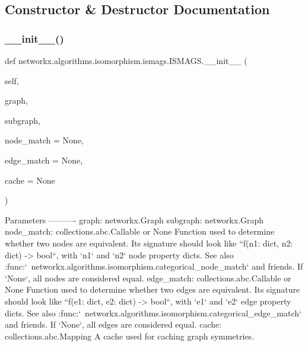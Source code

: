 \subsection{Constructor \& Destructor Documentation}
\mbox{\label{classnetworkx_1_1algorithms_1_1isomorphism_1_1ismags_1_1ISMAGS_a15c73c9b3bbbac8a6a2bf8c6d53e9528}} 
\subsubsection{\texorpdfstring{\+\_\+\+\_\+init\+\_\+\+\_\+()}{\_\_init\_\_()}}
{\footnotesize\ttfamily def networkx.\+algorithms.\+isomorphism.\+ismags.\+I\+S\+M\+A\+G\+S.\+\_\+\+\_\+init\+\_\+\+\_\+ (\begin{DoxyParamCaption}\item[{}]{self,  }\item[{}]{graph,  }\item[{}]{subgraph,  }\item[{}]{node\+\_\+match = {\ttfamily None},  }\item[{}]{edge\+\_\+match = {\ttfamily None},  }\item[{}]{cache = {\ttfamily None} }\end{DoxyParamCaption})}

\begin{DoxyVerb}Parameters
----------
graph: networkx.Graph
subgraph: networkx.Graph
node_match: collections.abc.Callable or None
    Function used to determine whether two nodes are equivalent. Its
    signature should look like ``f(n1: dict, n2: dict) -> bool``, with
    `n1` and `n2` node property dicts. See also
    :func:`~networkx.algorithms.isomorphism.categorical_node_match` and
    friends.
    If `None`, all nodes are considered equal.
edge_match: collections.abc.Callable or None
    Function used to determine whether two edges are equivalent. Its
    signature should look like ``f(e1: dict, e2: dict) -> bool``, with
    `e1` and `e2` edge property dicts. See also
    :func:`~networkx.algorithms.isomorphism.categorical_edge_match` and
    friends.
    If `None`, all edges are considered equal.
cache: collections.abc.Mapping
    A cache used for caching graph symmetries.
\end{DoxyVerb}
 

